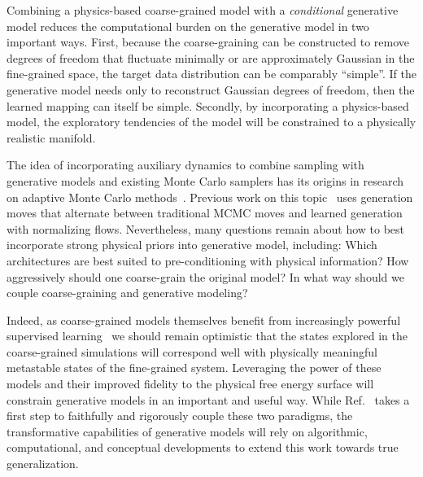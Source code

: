 \documentclass[11pt]{article}
\begin{document}
Combining a physics-based coarse-grained model with a \emph{conditional} generative model reduces the computational burden on the generative model in two important ways.
First, because the coarse-graining can be constructed to remove degrees of freedom that fluctuate minimally or are approximately Gaussian in the fine-grained space, the target data distribution can be comparably ``simple''. 
If the generative model needs only to reconstruct Gaussian degrees of freedom, then the learned mapping can itself be simple. 
Secondly, by incorporating a physics-based model, the exploratory tendencies of the model will be constrained to a physically realistic manifold. 

The idea of incorporating auxiliary dynamics to combine sampling with generative models and existing Monte Carlo samplers has its origins in research on adaptive Monte Carlo methods~\cite{del_moral_adaptive_2012}.
Previous work on this topic~\cite{gabrie_efficient_2021, gabrie_adaptive_2022} uses generation moves that alternate between traditional MCMC moves and learned generation with normalizing flows.
Nevertheless, many questions remain about how to best incorporate strong physical priors into generative model, including: Which architectures are best suited to pre-conditioning with physical information? How aggressively should one coarse-grain the original model? In what way should we couple coarse-graining and generative modeling?

Indeed, as coarse-grained models themselves benefit from increasingly powerful supervised learning~\cite{wang_machine_2019, husic_coarse_2020} we should remain optimistic that the states explored in the coarse-grained simulations will correspond well with physically meaningful metastable states of the fine-grained system. 
Leveraging the power of these models and their improved fidelity to the physical free energy surface will constrain generative models in an important and useful way. 
While Ref.~\cite{chennakesavalu_ensuring_2023} takes a first step to faithfully and rigorously couple these two paradigms, the transformative capabilities of generative models will rely on algorithmic, computational, and conceptual developments to extend this work towards true generalization. 


\end{document}
